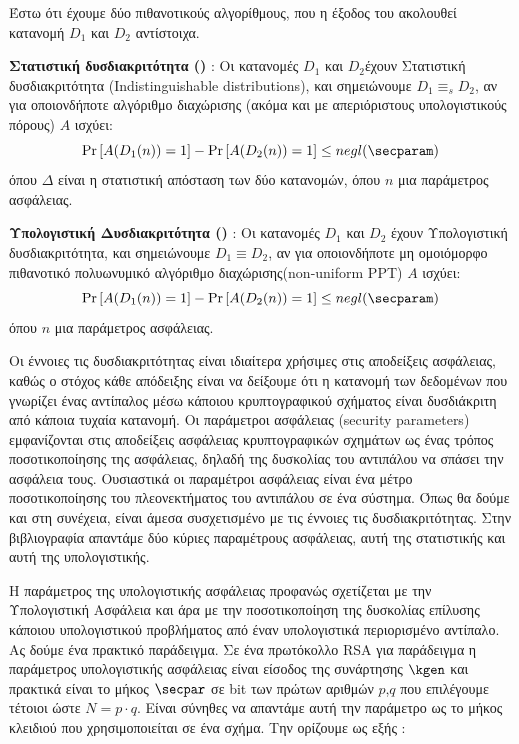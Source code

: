 Έστω ότι έχουμε δύο πιθανοτικούς αλγορίθμους, που η έξοδος του ακολουθεί κατανομή $D_1$ και $D_2$ αντίστοιχα.

\begin{definition}
\textbf{Στατιστική δυσδιακριτότητα ()} : Οι κατανομές $D_1$ και $D_2$έχουν Στατιστική δυσδιακριτότητα (Indistinguishable distributions), και σημειώνουμε $D_1 \equiv_s D_2$, αν για οποιονδήποτε αλγόριθμο διαχώρισης (ακόμα και με απεριόριστους υπολογιστικούς πόρους) $A$ ισχύει:
\[
\operatorname{Pr}\left[A(D_{1}(n))=1\right]-\operatorname{Pr}\left[A(D_{2}(n))=1\right] \leq negl(\secparam)
\]
όπου $Δ$ είναι η στατιστική απόσταση των δύο κατανομών, όπου $n$ μια παράμετρος ασφάλειας. 
\end{definition}

\begin{definition}
\textbf{Υπολογιστική Δυσδιακριτότητα ()} : Οι κατανομές $D_1$ και $D_2$ έχουν Υπολογιστική δυσδιακριτότητα, και σημειώνουμε $D_1 \equiv D_2$, αν για οποιονδήποτε μη ομοιόμορφο πιθανοτικό πολυωνυμικό αλγόριθμο διαχώρισης(non-uniform PPT) $A$ ισχύει:
\[
\operatorname{Pr}\left[A(D_{1}(n))=1\right]-\operatorname{Pr}\left[A(D_{2}(n))=1\right] \leq negl(\secparam)
\]
όπου $n$ μια παράμετρος ασφάλειας.
\end{definition}

Οι έννοιες τις δυσδιακριτότητας είναι ιδιαίτερα χρήσιμες στις αποδείξεις ασφάλειας, καθώς ο στόχος κάθε απόδειξης είναι να δείξουμε ότι η κατανομή των δεδομένων που γνωρίζει ένας αντίπαλος μέσω κάποιου κρυπτογραφικού σχήματος είναι δυσδιάκριτη από κάποια τυχαία κατανομή.
Οι παράμετροι ασφάλειας (security parameters) εμφανίζονται στις αποδείξεις ασφάλειας κρυπτογραφικών σχημάτων ως ένας τρόπος ποσοτικοποίησης της ασφάλειας, δηλαδή της δυσκολίας του αντιπάλου να σπάσει την ασφάλεια τους. Ουσιαστικά οι παραμέτροι ασφάλειας είναι ένα μέτρο ποσοτικοποίησης του πλεονεκτήματος του αντιπάλου σε ένα σύστημα. Όπως θα δούμε και στη συνέχεια, είναι άμεσα συσχετισμένο με τις έννοιες τις δυσδιακριτότητας. Στην βιβλιογραφία απαντάμε δύο κύριες παραμέτρους ασφάλειας, αυτή της στατιστικής και αυτή της υπολογιστικής.
 
Η παράμετρος της υπολογιστικής ασφάλειας προφανώς σχετίζεται με την Υπολογιστική Ασφάλεια και άρα με την ποσοτικοποίηση της δυσκολίας επίλυσης κάποιου υπολογιστικού προβλήματος από έναν υπολογιστικά περιορισμένο αντίπαλο. Ας δούμε ένα πρακτικό παράδειγμα. Σε ένα πρωτόκολλο RSA για παράδειγμα η παράμετρος υπολογιστικής ασφάλειας είναι είσοδος της συνάρτησης $\kgen$ και πρακτικά είναι το μήκος $\secpar$ σε bit των πρώτων αριθμών $p$,$q$ που επιλέγουμε τέτοιοι ώστε $N=p \cdot q$. Είναι σύνηθες να απαντάμε αυτή την παράμετρο ως το μήκος κλειδιού που χρησιμοποιείται σε ένα σχήμα. Την ορίζουμε ως εξής :

